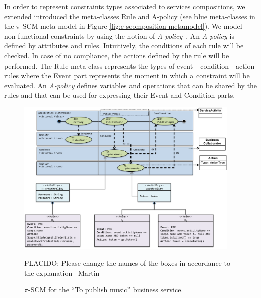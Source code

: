\begin{itemizedTrivlist}
\item In order to represent constraints types associated to services compositions, we extended introduced the meta-classes {\sc Rule} and {\sc A-policy} (see blue meta-classes in the $\pi$-SCM meta-model in Figure \ref{fig:e-scomposition-metamodel}).
We model non-functional constraints by using the notion of {\em A-policy}~\cite{Espinosa-Oviedo2011a,CIC:eovszmc09c}.
An {\em A-policy} is defined by attributes and rules. 
Intuitively, the conditions of each rule will be checked.
In case of no compliance, the actions defined by the rule will be performed.
The {\sc Rule} meta-class represents the types of event - condition - action rules where the {\sc Event} part represents the moment in which a constraint  will be evaluated.
An {\em A-policy} defines variables and operations that can be shared by the rules and that can be used for expressing their Event and Condition parts. 
\end{itemizedTrivlist}

\begin{figure}[t]%
\centering
\includegraphics[width=0.95\textwidth]{figs/e-composition-model}

{\color{red}\LARGE PLACIDO: Please change the names of the boxes in accordance to the explanation --Martin}

\caption{$\pi$-SCM for the ``To publish music'' business service.}
\label{fig:servicecompositionmodel}
\end{figure}

